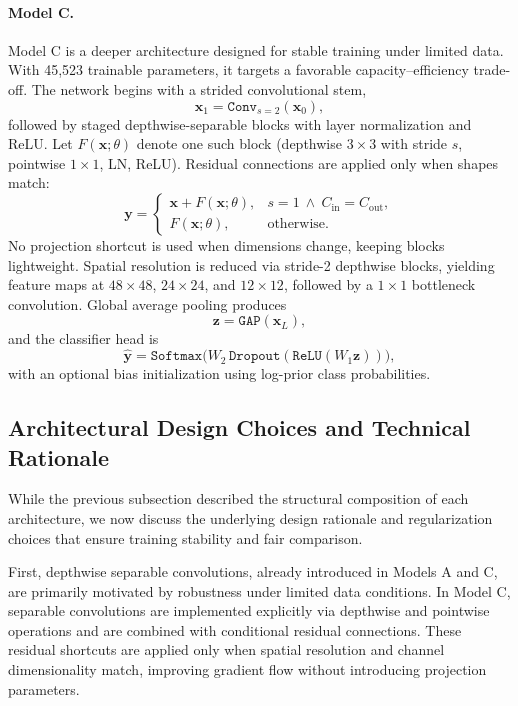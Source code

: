 \documentclass{article}
\begin{document}
\paragraph{Model C.}
Model C is a deeper architecture designed for stable training under limited data.
With 45{,}523 trainable parameters, it targets a favorable capacity--efficiency trade-off.
The network begins with a strided convolutional stem,
\[
\mathbf{x}_1=\texttt{Conv}_{s=2}(\mathbf{x}_0),
\]
followed by staged depthwise-separable blocks with layer normalization and ReLU.
Let $F(\mathbf{x};\theta)$ denote one such block (depthwise $3{\times}3$ with stride $s$,
pointwise $1{\times}1$, LN, ReLU). Residual connections are applied only when shapes match:
\[
\mathbf{y}=
\begin{cases}
\mathbf{x}+F(\mathbf{x};\theta), & s=1 \ \wedge\ C_{\text{in}}=C_{\text{out}},\\
F(\mathbf{x};\theta), & \text{otherwise}.
\end{cases}
\]
No projection shortcut is used when dimensions change, keeping blocks lightweight.
Spatial resolution is reduced via stride-2 depthwise blocks, yielding feature maps at
$48{\times}48$, $24{\times}24$, and $12{\times}12$, followed by a $1{\times}1$ bottleneck convolution.
Global average pooling produces
\[
\mathbf{z}=\texttt{GAP}(\mathbf{x}_L),
\]
and the classifier head is
\[
\hat{\mathbf{y}}=
\texttt{Softmax}\!\big(W_2\,\texttt{Dropout}(\texttt{ReLU}(W_1\mathbf{z}))\big),
\]
with an optional bias initialization using log-prior class probabilities.


\subsection{Architectural Design Choices and Technical Rationale}

While the previous subsection described the structural composition of each architecture, 
we now discuss the underlying design rationale and regularization choices that ensure 
training stability and fair comparison.

First, depthwise separable convolutions, already introduced in Models A and C, are 
primarily motivated by robustness under limited data conditions. In Model C, 
separable convolutions are implemented explicitly via depthwise and pointwise operations 
and are combined with conditional residual connections. These residual shortcuts are 
applied only when spatial resolution and channel dimensionality match, improving gradient 
flow without introducing projection parameters.
\end{document}
